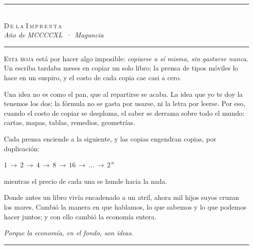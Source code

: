 \documentclass[11pt]{article}
\begin{document}
\begin{center}
\rule{0.72\textwidth}{0.6pt}\\[4pt]
{\Large\scshape D\,e\; l\,a\; I\,m\,p\,r\,e\,n\,t\,a}\\[3pt]
{\small\itshape Año de MCCCCXL \,·\, Maguncia}\\[4pt]
\rule{0.72\textwidth}{0.6pt}
\end{center}

\vspace{6pt}

\lettrine[lines=3,slope=0pt,findent=2pt,nindent=1pt]{E}{sta hoja} está por
hacer algo imposible: \emph{copiarse a sí misma, sin gastarse nunca}. Un
escriba tardaba meses en copiar un solo libro; la prensa de tipos móviles lo
hace en un suspiro, y el costo de cada copia cae casi a cero.

Una idea no es como el pan, que al repartirse se acaba. La idea que yo te doy
la tenemos los dos; la fórmula no se gasta por usarse, ni la letra por leerse.
Por eso, cuando el costo de copiar se desploma, el saber se derrama sobre todo
el mundo: cartas, mapas, tablas, remedios, geometrías.

Cada prensa enciende a la siguiente, y las copias engendran copias, por
duplicación:
\begin{center}
$1 \,\longrightarrow\, 2 \,\longrightarrow\, 4 \,\longrightarrow\, 8
\,\longrightarrow\, 16 \,\longrightarrow\, \dots \,\longrightarrow\, 2^{\,n}$
\end{center}
mientras el precio de cada una se hunde hacia la nada.

Donde antes un libro vivía encadenado a un atril, ahora mil hijos suyos cruzan
los mares. Cambió la manera en que hablamos, lo que sabemos y lo que podemos
hacer juntos; y con ello cambió la economía entera.

\vspace{8pt}
\begin{center}
{\itshape Porque la economía, en el fondo, son ideas.}\\[6pt]
\rule{0.4\textwidth}{0.6pt}
\end{center}
\end{document}
